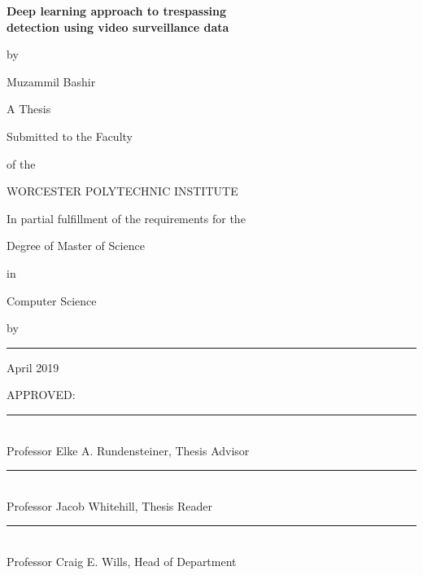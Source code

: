 \newcommand\x{13}

\onecolumn
\begin{center}
{ \LARGE
\textbf{Deep learning approach to trespassing   \\
\vspace{5pt}
detection using video surveillance data}
}

{ \normalsize
\vspace{\x pt}

by \vspace{\x pt}

Muzammil Bashir

\vspace{\x pt}

A Thesis 

\vspace{\x pt}

Submitted to the Faculty

\vspace{\x pt}

of the

\vspace{\x pt}

WORCESTER POLYTECHNIC INSTITUTE

\vspace{\x pt}

In partial fulfillment of the requirements for the

\vspace{\x pt}

Degree of Master of Science

\vspace{\x pt}

in

\vspace{\x pt}

Computer Science

\vspace{\x pt}

by

\vspace{\x pt}
\rule{0.6\textwidth}{1pt}

April 2019
}
\end{center}

{ \normalsize

\vspace{23 pt}
APPROVED:

\vspace{\x pt}
\rule{0.6\textwidth}{1pt} \\
Professor Elke A. Rundensteiner, Thesis Advisor

\vspace{\x pt}
\rule{0.6\textwidth}{1pt} \\
Professor Jacob Whitehill, Thesis Reader

\vspace{\x pt}
\rule{0.6\textwidth}{1pt} \\
Professor Craig E. Wills, Head of Department

}
\newpage \clearpage
